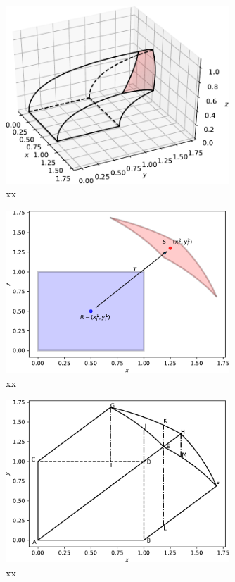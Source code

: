\documentclass{article}
\theoremstyle{theorem}
\theoremstyle{definition}
\begin{document}
\begin{figure}[htb]
\centering
\includegraphics[width=0.75\textwidth]{sphere_solid.pdf}
\caption{xx}
\label{fig:sphere_solid}
\end{figure}

\begin{figure}[htb]
\centering
\includegraphics[width=0.75\textwidth]{sphere_regions.pdf}
\caption{xx}
\label{fig:sphere_regions}
\end{figure}

\begin{figure}[htb]
\centering
\includegraphics[width=0.75\textwidth]{sphere_xy.pdf}
\caption{xx}
\label{fig:prismatoid_solid}
\end{figure}
\end{document}
